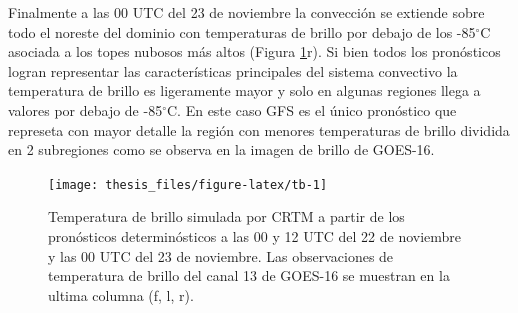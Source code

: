 \documentclass[12pt,oneside,a4paper]{reedthesis}
\begin{document}
Finalmente a las 00 UTC del 23 de noviembre la convección se extiende sobre todo el noreste del dominio con temperaturas de brillo por debajo de los -85\(^\circ\)C asociada a los topes nubosos más altos (Figura \ref{fig:tb}r). Si bien todos los pronósticos logran representar las características principales del sistema convectivo la temperatura de brillo es ligeramente mayor y solo en algunas regiones llega a valores por debajo de -85\(^\circ\)C. En este caso GFS es el único pronóstico que represeta con mayor detalle la región con menores temperaturas de brillo dividida en 2 subregiones como se observa en la imagen de brillo de GOES-16.


\begin{figure}

{\centering \texttt{[image: thesis\_files/figure-latex/tb-1]} 

}

\caption{Temperatura de brillo simulada por CRTM a partir de los pronósticos determinósticos a las 00 y 12 UTC del 22 de noviembre y las 00 UTC del 23 de noviembre. Las observaciones de temperatura de brillo del canal 13 de GOES-16 se muestran en la ultima columna (f, l, r).}\label{fig:tb}
\end{figure}
\end{document}
